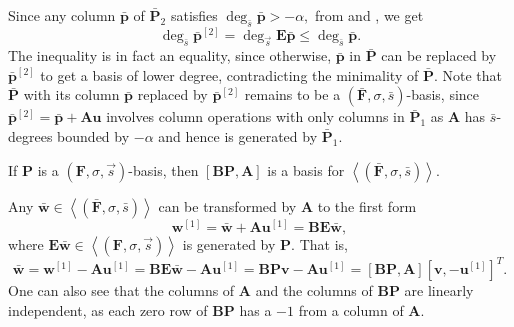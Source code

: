 \begin{pf}
Since any column $\bar{\mathbf{p}}$ of $\bar{\mathbf{P}}_{2}$ satisfies
$\deg_{\bar{s}}\bar{\mathbf{p}}>-\alpha,$ from 
and , we get \[
\deg_{\bar{s}}\bar{\mathbf{p}}^{[2]}=\deg_{\vec{s}}\mathbf{E}\bar{\mathbf{p}}\le\deg_{\bar{s}}\bar{\mathbf{p}}.\]
 The inequality is in fact an equality, since otherwise, $\bar{\mathbf{p}}$
in $\bar{\mathbf{P}}$ can be replaced by $\bar{\mathbf{p}}^{[2]}$
to get a basis of lower degree, contradicting the minimality of $\bar{\mathbf{P}}$.
Note that $\bar{\mathbf{P}}$ with its column $\bar{\mathbf{p}}$
replaced by $\bar{\mathbf{p}}^{[2]}$ remains to be a $\left(\bar{\mathbf{F}},\sigma,\bar{s}\right)$-basis,
since $\bar{\mathbf{p}}^{[2]}=\bar{\mathbf{p}}+\mathbf{A}\mathbf{u}$
involves column operations with only columns in $\bar{\mathbf{P}}_{1}$
as $\mathbf{A}$ has $\bar{s}$-degrees bounded by $-\alpha$ and
hence is generated by $\bar{\mathbf{P}}_{1}$.\end{pf}
\begin{lem}
\label{lem:PtoBPA}If $\mathbf{P}$ is a $\left(\mathbf{F},\sigma,\vec{s}\right)$-basis,
then $\left[\mathbf{B}\mathbf{P},\mathbf{A}\right]$ is a basis for
$\left\langle \left(\bar{\mathbf{F}},\sigma,\bar{s}\right)\right\rangle $.\end{lem}
\begin{pf}
Any $\bar{\mathbf{w}}\in\left\langle \left(\bar{\mathbf{F}},\sigma,\bar{s}\right)\right\rangle $
can be transformed by $\mathbf{A}$ to the first form \[
\mathbf{w}^{[1]}=\bar{\mathbf{w}}+\mathbf{A}\mathbf{u}^{[1]}=\mathbf{B}\mathbf{E}\bar{\mathbf{w}},\]
 where $\mathbf{E}\bar{\mathbf{w}}\in\left\langle \left(\mathbf{F},\sigma,\vec{s}\right)\right\rangle $
is generated by $\mathbf{P}$. That is, \[
\bar{\mathbf{w}}=\mathbf{w}^{[1]}-\mathbf{A}\mathbf{u}^{[1]}=\mathbf{B}\mathbf{E}\bar{\mathbf{w}}-\mathbf{A}\mathbf{u}^{[1]}=\mathbf{B}\mathbf{P}\mathbf{v}-\mathbf{A}\mathbf{u}^{[1]}=\left[\mathbf{B}\mathbf{P},\mathbf{A}\right][\mathbf{v},-\mathbf{u}^{[1]}]^{T}.\]
 One can also see that the columns of $\mathbf{A}$ and the columns
of $\mathbf{B}\mathbf{P}$ are linearly independent, as each zero
row of $\mathbf{B}\mathbf{P}$ has a $-1$ from a column of $\mathbf{A}$. 
\end{pf}
%
